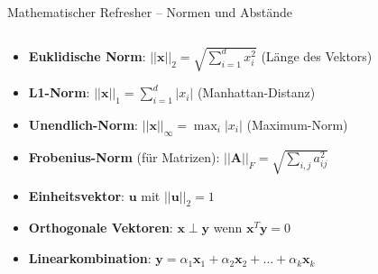 \documentclass[aspectratio=1610, xcolor=dvipsnames, 9pt]{beamer}
\begin{document}
\begin{frame}{Mathematischer Refresher -- Normen und Abstände}
  \begin{columns}
    \begin{column}{1\textwidth}
      \begin{itemize}
        \item \textbf{Euklidische Norm}: $||\mathbf{x}||_2 = \sqrt{\sum_{i=1}^{d} x_i^2}$ (Länge des Vektors)
        \item \textbf{L1-Norm}: $||\mathbf{x}||_1 = \sum_{i=1}^{d} |x_i|$ (Manhattan-Distanz)
        \item \textbf{Unendlich-Norm}: $||\mathbf{x}||_\infty = \max_i |x_i|$ (Maximum-Norm)
        \item \textbf{Frobenius-Norm} (für Matrizen): $||\mathbf{A}||_F = \sqrt{\sum_{i,j} a_{ij}^2}$
        \item \textbf{Einheitsvektor}: $\mathbf{u}$ mit $||\mathbf{u}||_2 = 1$
        \item \textbf{Orthogonale Vektoren}: $\mathbf{x} \perp \mathbf{y}$ wenn $\mathbf{x}^T \mathbf{y} = 0$
        \item \textbf{Linearkombination}: $\mathbf{y} = \alpha_1 \mathbf{x}_1 + \alpha_2 \mathbf{x}_2 + \ldots + \alpha_k \mathbf{x}_k$
      \end{itemize}
    \end{column}
  \end{columns}
\end{frame}
\end{document}
